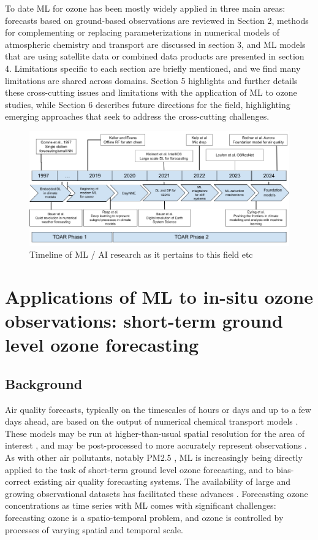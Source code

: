 \documentclass[gmd, manuscript]{copernicus}
\begin{document}
To date ML for ozone has been mostly widely applied in three main areas: forecasts based on ground-based observations are reviewed in Section 2, methods for complementing or replacing parameterizations in numerical models of atmospheric chemistry and transport are discussed in section 3, and ML models that are using satellite data or combined data products are presented in section 4. Limitations specific to each section are briefly mentioned, and we find many limitations are shared across domains. Section 5 highlights and further details these cross-cutting issues and limitations with the application of ML to ozone studies, while Section 6 describes future directions for the field, highlighting emerging approaches that seek to address the cross-cutting challenges.


\begin{figure}
    \centering
    \includegraphics[width=0.95\linewidth]{figures/In progress ML4O3.png} 
    \caption{Timeline of ML / AI research as it pertains to this field etc}
    \label{fig:timeline}
\end{figure}

\section{Applications of ML to in-situ ozone observations: short-term ground level ozone forecasting}

\subsection{Background}
Air quality forecasts, typically on the timescales of hours or days and up to a few days ahead, are based on the output of numerical chemical transport models \citep{Marecal2015}. These models may be run at higher-than-usual spatial resolution for the area of interest \citep{Savage2013}, and may be post-processed to more accurately represent observations \citep{Casciaro2022}. As with other air pollutants, notably PM2.5 \citep{Feng2015}, ML is increasingly being directly applied to the task of short-term ground level ozone forecasting, and to bias-correct existing air quality forecasting systems. The availability of large and growing observational datasets has facilitated these advances \citep{Schultz2017}. Forecasting ozone concentrations as time series with ML comes with significant  challenges: forecasting ozone is a spatio-temporal problem, and ozone is controlled by processes of varying spatial and temporal scale.  
\end{document}
